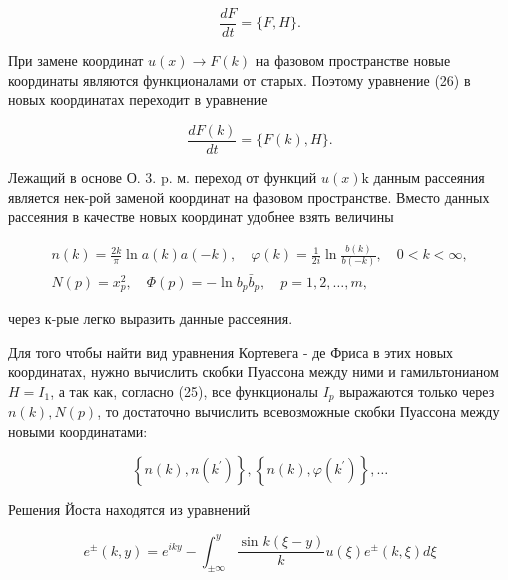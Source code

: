 \documentclass[10pt]{article}
\begin{document}
\[

\frac{d F}{d t}=\{F, H\} .

\]



При замене координат $u(x) \rightarrow F(k)$ на фазовом пространстве новые координаты являются функционалами от старых. Поэтому уравнение (26) в новых координатах переходит в уравнение



\[

\frac{d F(k)}{d t}=\{F(k), H\} .

\]



Лежащий в основе О. 3. p. м. переход от функций $u(x) \mathrm{k}$ данным рассеяния является нек-рой заменой координат на фазовом пространстве. Вместо данных рассеяния в качестве новых координат удобнее взять величины



\[

\begin{gathered}

n(k)=\frac{2 k}{\pi} \ln a(k) a(-k), \quad \varphi(k)=\frac{1}{2 i} \ln \frac{b(k)}{b(-k)}, \quad 0<k<\infty, \\

N(p)=x_{p}^{2}, \quad \Phi(p)=-\ln b_{p} \bar{b}_{p}, \quad p=1,2, \ldots, m,

\end{gathered}

\]



через к-рые легко выразить данные рассеяния.



Для того чтобы найти вид уравнения Кортевега - де Фриса в этих новых координатах, нужно вычислить скобки Пуассона между ними и гамильтонианом $H=I_{1}$, а так как, согласно (25), все функционалы $I_{p}$ выражаются только через $n(k), N(p)$, то достаточно вычислить всевозможные скобки Пуассона между новыми координатами:



\[

\left\{n(k), n\left(k^{\prime}\right)\right\},\left\{n(k), \varphi\left(k^{\prime}\right)\right\}, \ldots

\]



Решения Йоста находятся из уравнений



\[

e^{ \pm}(k, y)=e^{i k y}-\int_{ \pm \infty}^{y} \frac{\sin k(\xi-y)}{k} u(\xi) e^{ \pm}(k, \xi) d \xi

\]
\end{document}
